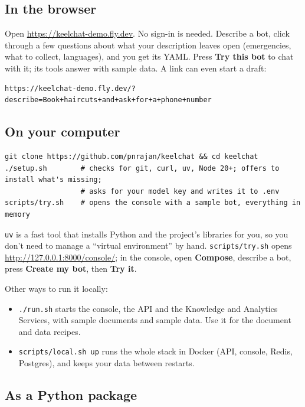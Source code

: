 \documentclass[11pt,a4paper]{article}
\newcommand{\codeus}{\textunderscore\allowbreak}
\newcommand{\code}[1]{{\renewcommand{\_}{\codeus}\texttt{\upshape #1}}}
\begin{document}
\subsection{In the browser}

Open \url{https://keelchat-demo.fly.dev}. No sign-in is needed. Describe a bot, click through a few questions
about what your description leaves open (emergencies, what to collect, languages), and you get its YAML. Press
\textbf{Try this bot} to chat with it; its tools answer with sample data. A link can even start a draft:

\begin{lstlisting}[style=bashstyle]
https://keelchat-demo.fly.dev/?describe=Book+haircuts+and+ask+for+a+phone+number
\end{lstlisting}

\subsection{On your computer}

\begin{lstlisting}[style=bashstyle]
git clone https://github.com/pnrajan/keelchat && cd keelchat
./setup.sh        # checks for git, curl, uv, Node 20+; offers to install what's missing;
                  # asks for your model key and writes it to .env
scripts/try.sh    # opens the console with a sample bot, everything in memory
\end{lstlisting}

\code{uv} is a fast tool that installs Python and the project's libraries for you, so you don't need to manage a
``virtual environment'' by hand. \code{scripts/try.sh} opens \url{http://127.0.0.1:8000/console/}; in the
console, open \textbf{Compose}, describe a bot, press \textbf{Create my bot}, then \textbf{Try it}.

Other ways to run it locally:
\begin{itemize}[leftmargin=1.2em]
  \item \code{./run.sh} starts the console, the API and the Knowledge and Analytics Services, with sample
    documents and sample data. Use it for the document and data recipes.
  \item \code{scripts/local.sh up} runs the whole stack in Docker (API, console, Redis, Postgres), and keeps your
    data between restarts.
\end{itemize}

\subsection{As a Python package}
\end{document}
